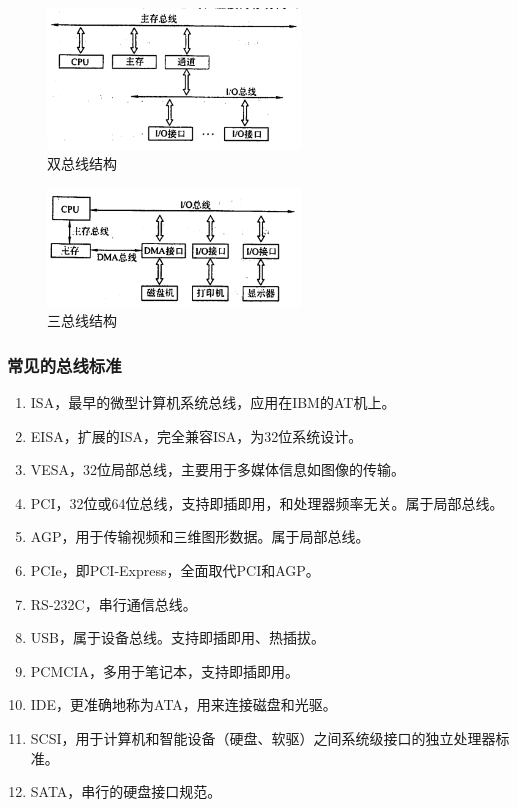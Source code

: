 \documentclass[12pt, a4paper, oneside]{ctexart}
\begin{document}
\begin{figure}
  \centering
  \includegraphics[width=0.6\textwidth]{./images/double-bus-structure.png}
  \caption{双总线结构}
  \label{double-bus-structure}
\end{figure}

\begin{figure}
  \centering
  \includegraphics[width=0.6\textwidth]{./images/triple-bus-structure.png}
  \caption{三总线结构}
  \label{triple-bus-structure}
\end{figure}

\subsubsection{常见的总线标准}

\begin{enumerate}
  \item ISA，最早的微型计算机系统总线，应用在IBM的AT机上。
  \item EISA，扩展的ISA，完全兼容ISA，为32位系统设计。
  \item VESA，32位局部总线，主要用于多媒体信息如图像的传输。
  \item PCI，32位或64位总线，支持即插即用，和处理器频率无关。属于局部总线。
  \item AGP，用于传输视频和三维图形数据。属于局部总线。
  \item PCIe，即PCI-Express，全面取代PCI和AGP。
  \item RS-232C，串行通信总线。
  \item USB，属于设备总线。支持即插即用、热插拔。
  \item PCMCIA，多用于笔记本，支持即插即用。
  \item IDE，更准确地称为ATA，用来连接磁盘和光驱。
  \item SCSI，用于计算机和智能设备（硬盘、软驱）之间系统级接口的独立处理器标准。
  \item SATA，串行的硬盘接口规范。
\end{enumerate}
\end{document}
